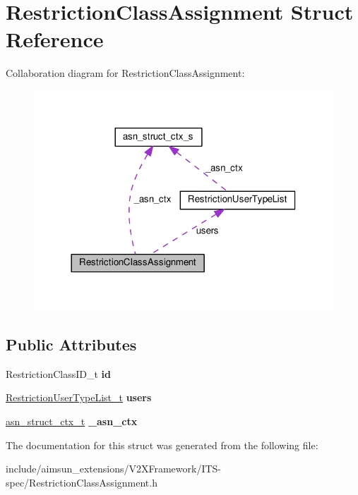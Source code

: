 \hypertarget{structRestrictionClassAssignment}{}\section{Restriction\+Class\+Assignment Struct Reference}
\label{structRestrictionClassAssignment}


Collaboration diagram for Restriction\+Class\+Assignment\+:\nopagebreak
\begin{figure}[H]
\begin{center}
\leavevmode
\includegraphics[width=318pt]{structRestrictionClassAssignment__coll__graph}
\end{center}
\end{figure}
\subsection*{Public Attributes}
\begin{DoxyCompactItemize}
\item 
Restriction\+Class\+I\+D\+\_\+t {\bfseries id}\hypertarget{structRestrictionClassAssignment_ac8d0b875ffaff0b05b3ffc3616ae4115}{}\label{structRestrictionClassAssignment_ac8d0b875ffaff0b05b3ffc3616ae4115}

\item 
\hyperlink{structRestrictionUserTypeList}{Restriction\+User\+Type\+List\+\_\+t} {\bfseries users}\hypertarget{structRestrictionClassAssignment_af1a3ac4e3dc6f6d5c30f7d8c399a875e}{}\label{structRestrictionClassAssignment_af1a3ac4e3dc6f6d5c30f7d8c399a875e}

\item 
\hyperlink{structasn__struct__ctx__s}{asn\+\_\+struct\+\_\+ctx\+\_\+t} {\bfseries \+\_\+asn\+\_\+ctx}\hypertarget{structRestrictionClassAssignment_ae2704b82fd5a2e865243c0ab57404be0}{}\label{structRestrictionClassAssignment_ae2704b82fd5a2e865243c0ab57404be0}

\end{DoxyCompactItemize}


The documentation for this struct was generated from the following file\+:\begin{DoxyCompactItemize}
\item 
include/aimsun\+\_\+extensions/\+V2\+X\+Framework/\+I\+T\+S-\/spec/Restriction\+Class\+Assignment.\+h\end{DoxyCompactItemize}
